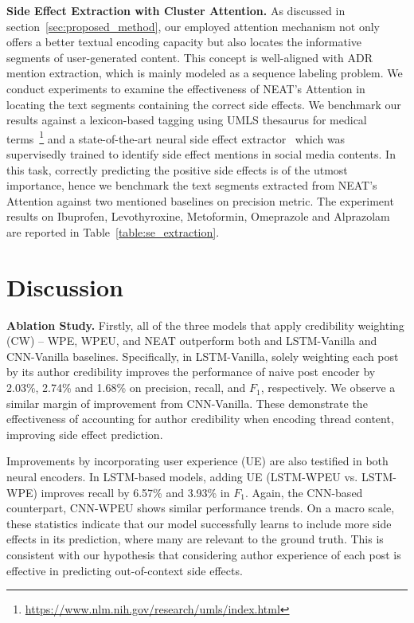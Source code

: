 \documentclass{bmcart}
\begin{document}
{\bf Side Effect Extraction with Cluster Attention.}\label{subsec:se_extraction}
As discussed in section~\ref{sec:proposed_method}, our employed attention mechanism not only offers a better textual encoding capacity but also locates the informative segments of user-generated content. This concept is well-aligned with ADR mention extraction, which is mainly modeled as a sequence labeling problem. We conduct experiments to examine the effectiveness of NEAT's Attention in locating the text segments containing the correct side effects. We benchmark our results against a lexicon-based tagging using UMLS thesaurus for medical terms~\footnote{\scriptsize{\url{https://www.nlm.nih.gov/research/umls/index.html}}} and a state-of-the-art neural side effect extractor~\cite{ding2018attentive} which was supervisedly trained to identify side effect mentions in social media contents. In this task, correctly predicting the positive side effects is of the utmost importance, hence we benchmark the text segments extracted from NEAT's Attention against two mentioned baselines on precision metric. The experiment results on Ibuprofen, Levothyroxine, Metoformin, Omeprazole and Alprazolam are reported in Table~\ref{table:se_extraction}.

\section{Discussion}\label{sec:discussion}
{\bf Ablation Study.}
Firstly, all of the three models that
apply credibility weighting (CW) -- WPE, WPEU, and NEAT
outperform both and LSTM-Vanilla and CNN-Vanilla baselines.
Specifically, in LSTM-Vanilla, solely weighting each post 
by its author credibility improves the performance of naive post encoder by 2.03\%, 2.74\% and 1.68\% on precision, recall, and $F_1$, respectively. We observe a similar margin of improvement from CNN-Vanilla. These demonstrate the effectiveness of accounting for author credibility when encoding thread content, improving side effect prediction.

Improvements by incorporating user experience (UE) are 
also testified in both neural encoders. In LSTM-based models, adding UE (LSTM-WPEU vs. LSTM-WPE) improves recall
by 6.57\% and 3.93\% in $F_1$.  Again, the CNN-based counterpart, CNN-WPEU shows similar performance trends.  On a macro scale, these statistics indicate 
that our model successfully learns to include more side effects in its prediction,
where many are relevant to the ground truth.  This is consistent with
our hypothesis that considering author experience of each post is effective in predicting out-of-context side effects.
\end{document}
